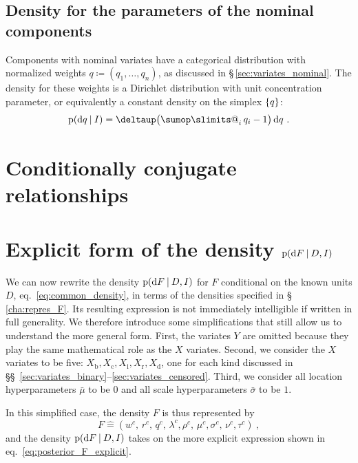 \documentclass[\ifafour a4paper,12pt,\else a5paper,10pt,\fi%
onecolumn,oneside,article,%
british%
]{memoir}
\makeatletter
\theoremstyle{remark}
\theoremstyle{innote}
\def\sum{\DOTSI\sumop\slimits@}
\newcommand*{\delt}{\deltaup}%
\newcommand*{\di}{\mathrm{d}}%
\newcommand*{\defd}{\coloneqq}
\newcommand*{\corr}{\mathrel{\hat{=}}}%
\DeclarePairedDelimiter\set{\{}{\}} %
\newcommand*{\p}{\mathrm{p}}%
\renewcommand*{\|}[1][]{\nonscript\:#1\vert\nonscript\:\mathopen{}}
\newcommand*{\sect}{\S}%
\newcommand*{\sects}{\S\S}%
\newcommand*{\eqn}{eq.}%
\newcommand*{\tsum}{\mathop{\textstyle\sum}\nolimits}
\newcommand*{\muo}{\bar{\mu}}
\newcommand*{\sigmao}{\bar{\sigma}}
\newcommand*{\vr}{\textrm{r}}
\newcommand*{\vd}{\textrm{d}}
\newcommand*{\vi}{\textrm{i}}
\newcommand*{\vb}{\textrm{b}}
\newcommand*{\vc}{\textrm{c}}
\makeatother
\begin{document}
\subsection{Density for the parameters of the nominal components}
\label{sec:density_nominal}

Components with nominal variates have a categorical distribution with normalized weights $q \defd (q_{1},\dotsc,q_{n})$, as discussed in \sect\,\ref{sec:variates_nominal}. The density for these weights is a Dirichlet distribution with unit concentration parameter, or equivalently a constant density on the simplex $\set{q}$:
\begin{equation}
  \label{eq:density_q_nominal}
  \p(\di q\|I) = \delt\bigl(\tsum_{i}q_{i}-1\bigr)\,\di q \ .
\end{equation}



\medskip

\section{Conditionally conjugate relationships}
\label{sec:condition_conj}


\section{Explicit form of the density $\p(\di F\|D,I)$}
\label{sec:explicit_posterion_F}

We can now rewrite the density $\p(\di F \| D,I)$ for $F$ conditional on the known units $D$, \eqn~\eqref{eq:common_density}, in terms of the densities specified in \sect\,\ref{cha:repres_F}. Its resulting expression is not immediately intelligible if written in full generality. We therefore introduce some simplifications that still allow us to understand the more general form. First, the variates $Y$ are omitted because they play the same mathematical role as the $X$ variates. Second, we consider the $X$ variates to be five: $X_{\vb},X_{\vc},X_{\vi},X_{\vr},X_{\vd}$, one for each kind discussed in \sects~\ref{sec:variates_binary}--\ref{sec:variates_censored}. Third, we consider all location hyperparameters $\muo$ to be $0$ and all scale hyperparameters $\sigmao$ to be $1$.

In this simplified case, the density $F$ is thus represented by
\begin{equation}
  \label{eq:simple_F_repres}
F \corr (w^{c},\, r^{c},\, q^{c},\,
  \lambda^{c}, \rho^{c},\,
  \mu^{c}, \sigma^{c},\,
  \nu^{c}, \tau^{c}) \ ,
\end{equation}
and the density $\p(\di F \| D,I)$ takes on the more explicit expression shown in \eqn~\eqref{eq:posterior_F_explicit}.
\end{document}
